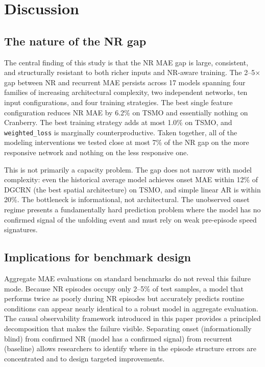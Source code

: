 \documentclass[a4paper]{cas-sc}
\begin{document}
\section{Discussion}
\label{sec:discussion}

\subsection{The nature of the NR gap}

The central finding of this study is that the NR MAE gap is large,
consistent, and structurally resistant to both richer inputs and
NR-aware training.
The 2--5$\times$ gap between NR and recurrent MAE persists across 17
models spanning four families of increasing architectural complexity,
two independent networks, ten input configurations, and four training
strategies.
The best single feature configuration reduces NR MAE by 6.2\% on TSMO
and essentially nothing on Cranberry.
The best training strategy adds at most 1.0\% on TSMO, and
\texttt{weighted\_loss} is marginally counterproductive.
Taken together, all of the modeling interventions we tested close
at most 7\% of the NR gap on the more responsive network and
nothing on the less responsive one.

This is not primarily a capacity problem.
The gap does not narrow with model complexity:
even the historical average model achieves onset MAE within 12\% of
DGCRN (the best spatial architecture) on TSMO, and simple linear AR
is within 20\%.
The bottleneck is informational, not architectural.
The unobserved onset regime presents a fundamentally hard prediction
problem where the model has no confirmed signal of the unfolding
event and must rely on weak pre-episode speed signatures.

\subsection{Implications for benchmark design}

Aggregate MAE evaluations on standard benchmarks do not reveal this
failure mode.
Because NR episodes occupy only 2--5\% of test samples, a model
that performs twice as poorly during NR episodes but accurately
predicts routine conditions can appear nearly identical to a
robust model in aggregate evaluation.
The causal observability framework introduced in this paper provides
a principled decomposition that makes the failure visible.
Separating onset (informationally blind) from confirmed NR
(model has a confirmed signal) from recurrent (baseline)
allows researchers to identify where in the episode structure
errors are concentrated and to design targeted improvements.
\end{document}
